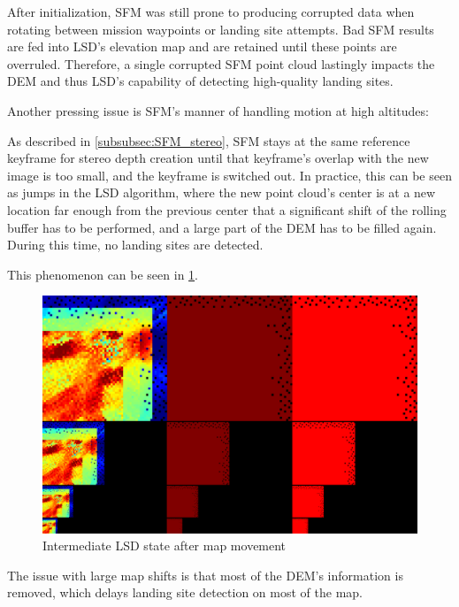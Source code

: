 After initialization, SFM was still prone to producing corrupted data when rotating between mission waypoints or landing site attempts. Bad SFM results are fed into LSD's elevation map and are retained until these points are overruled. Therefore, a single corrupted SFM point cloud lastingly impacts the DEM and thus LSD's capability of detecting high-quality landing sites.

Another pressing issue is SFM's manner of handling motion at high altitudes:

As described in \cref{subsubsec:SFM_stereo}, SFM stays at the same reference keyframe for stereo depth creation until that keyframe's overlap with the new image is too small, and the keyframe is switched out. In practice, this can be seen as jumps in the LSD algorithm, where the new point cloud's center is at a new location far enough from the previous center that a significant shift of the rolling buffer has to be performed, and a large part of the DEM has to be filled again. During this time, no landing sites are detected.

This phenomenon can be seen in \cref{fig:SFM_movement1}. 

\begin{figure}[h]
\centering
\includegraphics[scale=0.25]{images/evaluation/SFM_issues/Screenshot from 2024-06-20 14-41-06.png}
\caption{Intermediate LSD state after map movement}
\label{fig:SFM_movement1}
\end{figure}


The issue with large map shifts is that most of the DEM's information is removed, which delays landing site detection on most of the map.


